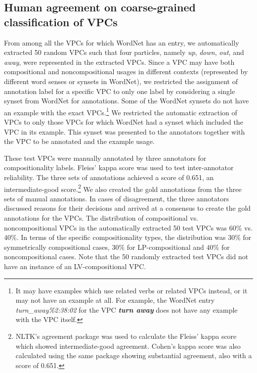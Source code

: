 \documentclass[output=paper
,modfonts
,nonflat]{langsci/langscibook}
\begin{document}
\subsection{Human agreement on coarse-grained classification of VPCs} \label{sec:iaa-comp}

From among all the VPCs for which WordNet has an entry, we automatically extracted 50 random VPCs such that four particles, namely \textit{up}, \textit{down}, \textit{out}, and \textit{away}, were represented in the extracted VPCs. Since a VPC may have both compositional and noncompositional usages in different contexts (represented by different word senses or synsets in WordNet), we restricted the assignment of annotation label for a specific VPC to only one label by considering a single synset from WordNet for annotations. Some of the WordNet synsets do not have an example with the exact VPCs.\footnote{It may have examples which use related verbs or related VPCs instead, or it may not have an example at all. For example, the WordNet entry \textit{turn\_away\%2:38:02} for the VPC \textit{\textbf{turn away}} does not have any example with the VPC itself.} We restricted the automatic extraction of VPCs to only those VPCs for which WordNet had a synset which included the VPC in its example. This synset was presented to the annotators together with the VPC to be annotated and the example usage.

These test VPCs were manually annotated by three annotators for compositionality labels. Fleiss' kappa score \citep{Fle71} was used to test inter-annotator reliability. The three sets of annotations achieved a score of 0.651, an intermediate-good score.\footnote{NLTK's agreement package was used to calculate the Fleiss' kappa score which showed intermediate-good agreement. Cohen's kappa score \citep{Coh60} was also calculated using the same package showing substantial agreement, also with a score of 0.651.} We also created the gold annotations from the three sets of manual annotations. In cases of disagreement, the three annotators discussed reasons for their decisions and arrived at a consensus to create the gold annotations for the VPCs. The distribution of compositional vs. noncompositional VPCs in the automatically extracted 50 test VPCs was $60\%$ vs. $40\%$. In terms of the specific compositionality types, the distribution was $30\%$ for symmetrically compositional cases, $30\%$ for LP-compositional and $40\%$ for noncompositional cases. Note that the 50 randomly extracted test VPCs did not have an instance of an LV-compositional VPC.
\end{document}
